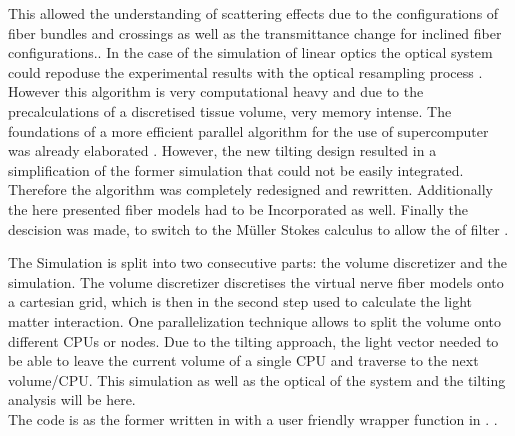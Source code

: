 This allowed the understanding of scattering effects due to the configurations of fiber bundles and crossings as well as the transmittance change for inclined fiber configurations.\cite{MenzelDissertation,Menzel2020,Menzel2021}.
% 
In the case of the simulation of linear optics the optical system could repoduse the experimental results with \eg{} the optical resampling process \cite{Dohmen2015,Menzel2016}.
However this algorithm is very computational heavy and due to the precalculations of a discretised tissue volume, very memory intense.
The foundations of a more efficient parallel algorithm for the use of supercomputer was already elaborated \cite{Lucksch2016}.
However, the new tilting design resulted in a simplification of the former simulation that could not be easily integrated.
Therefore the algorithm was completely redesigned and rewritten.
Additionally the here presented fiber models had to be Incorporated as well.
Finally the descision was made, to switch to the M\"uller Stokes calculus to allow the \dummy{} of filter \dummy{}.
%
\par
%
The Simulation is split into two consecutive parts: the volume discretizer and the simulation.
The volume discretizer discretises the virtual nerve fiber models onto a cartesian grid, which is then in the second step used to calculate the light matter interaction.
One parallelization technique allows to split the volume onto different \acp{CPU} or nodes.
Due to the tilting approach, the light vector needed to be able to leave the current volume of a single \ac{CPU} and traverse to the next volume/\ac{CPU}.
This simulation as well as the optical \dummy{} of the system and the tilting analysis will be \dummy{} here.
\\
%
The code is as the former written in \cpp{} with a user friendly wrapper function in \python{}.
%
.
%
%
